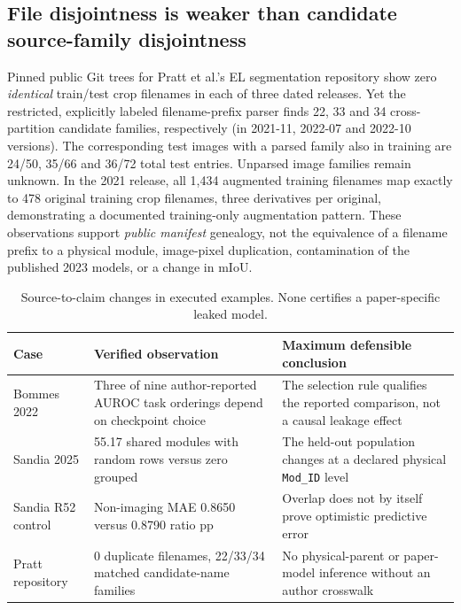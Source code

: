\documentclass[10pt,a4paper]{article}
\begin{document}
\subsection{File disjointness is weaker than candidate source-family disjointness}
Pinned public Git trees for Pratt et al.'s EL segmentation repository \cite{pratt2023} show zero \emph{identical} train/test crop filenames in each of three dated releases. Yet the restricted, explicitly labeled filename-prefix parser finds 22, 33 and 34 cross-partition candidate families, respectively (in 2021-11, 2022-07 and 2022-10 versions). The corresponding test images with a parsed family also in training are 24/50, 35/66 and 36/72 total test entries. Unparsed image families remain unknown. In the 2021 release, all 1,434 augmented training filenames map exactly to 478 original training crop filenames, three derivatives per original, demonstrating a documented training-only augmentation pattern. These observations support \emph{public manifest} genealogy, not the equivalence of a filename prefix to a physical module, image-pixel duplication, contamination of the published 2023 models, or a change in mIoU.

\begin{table}[ht]\centering\small
\caption{Source-to-claim changes in executed examples. None certifies a paper-specific leaked model.}
\begin{tabularx}{\linewidth}{@{}p{2.0cm}X X@{}}\toprule
Case & Verified observation & Maximum defensible conclusion \\ \midrule
Bommes 2022 & Three of nine author-reported AUROC task orderings depend on checkpoint choice & The selection rule qualifies the reported comparison, not a causal leakage effect \\
Sandia 2025 & 55.17 shared modules with random rows versus zero grouped & The held-out population changes at a declared physical \texttt{Mod\_ID} level \\
Sandia R52 control & Non-imaging MAE 0.8650 versus 0.8790 ratio pp & Overlap does not by itself prove optimistic predictive error \\
Pratt repository & 0 duplicate filenames, 22/33/34 matched candidate-name families & No physical-parent or paper-model inference without an author crosswalk \\
\bottomrule\end{tabularx}
\end{table}
\end{document}
